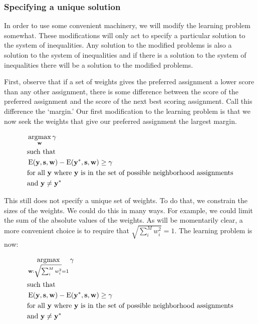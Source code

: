\subsubsection{Specifying a unique solution}
In order to use some convenient machinery, we will modify the learning
problem somewhat. These modifications will only act to specify a
particular solution to the system of inequalities. Any solution to the
modified problems is also a solution to the system of inequalities and
if there is a solution to the system of inequalities there will be a
solution to the modified problems.

First, observe that if a set of weights gives the preferred assignment
a lower score than any other assignment, there is some difference
between the score of the preferred assignment and the score of the
next best scoring assignment. Call this difference the `margin.' Our
first modification to the learning problem is that we now seek the
weights that give our preferred assignment the largest margin.

\begin{align}
&\operatorname*{\arg\!\max}_{\mathbf{w}} \mathbf{\gamma} \\
&\text{such that} \\
&\operatorname{E}(\mathbf{y}, \mathbf{s}, \mathbf{w})
- \operatorname{E}(\mathbf{y}^*, \mathbf{s}, \mathbf{w}) \geq \gamma\\ 
&\text{for all } \mathbf{y} \text{ where } \mathbf{y} \text{ is in the set of
  possible neighborhood assignments}\\
&\text{and } \mathbf{y} \neq \mathbf{y}^*
\end{align}

This still does not specify a unique set of weights. To do that, we
constrain the sizes of the weights. We could do this in many ways. For
example, we could limit the sum of the absolute values of the weights. As
will be momentarily clear, a more convenient choice is to require that
$\sqrt{\sum_i^M w_i^2} = 1$. The learning problem is now:

%
\begin{align*}
&\operatorname*{\arg\!\max}_{\mathbf{w}:\sqrt{\sum_i^M w_i^2}=1} \mathbf{\gamma} \\
&\text{such that} \\
&\operatorname{E}(\mathbf{y}, \mathbf{s}, \mathbf{w})
- \operatorname{E}(\mathbf{y}^*, \mathbf{s}, \mathbf{w}) \geq \gamma\\ 
&\text{for all } \mathbf{y} \text{ where } \mathbf{y} \text{ is in the set of
  possible neighborhood assignments}\\
&\text{and } \mathbf{y} \neq \mathbf{y}^*
\end{align*}
%

